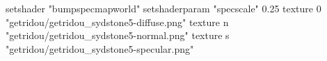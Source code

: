 setshader "bumpspecmapworld"
setshaderparam "specscale" 0.25
texture 0 "getridou/getridou_sydstone5-diffuse.png"
texture n "getridou/getridou_sydstone5-normal.png"
texture s "getridou/getridou_sydstone5-specular.png"
